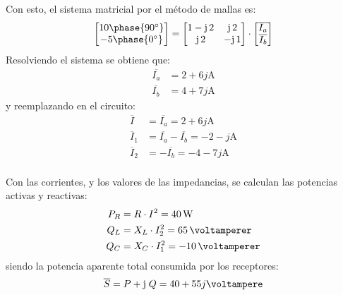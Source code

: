 \begin{example}
          Con esto, el sistema matricial por el método de mallas es:
          \begin{equation*}
            \begin{bmatrix}
              10\phase{90^\circ} \\
              -5\phase{0^\circ} 
            \end{bmatrix}
            =
            \begin{bmatrix}
              1-\mathrm{j}\,2 & \mathrm{j}\,2 \\
              \mathrm{j}\,2 & -\mathrm{j}\,1 \\
            \end{bmatrix}
            \cdot 
            \begin{bmatrix}
              \overline{I_a}\\
              \overline{I_b}
            \end{bmatrix}
          \end{equation*}
          Resolviendo el sistema se obtiene que:
          \begin{align*}
            \overline{I_a}&= 2 + 6j\unit{\ampere}\\
            \overline{I_b}&= 4 + 7j\unit{\ampere}
          \end{align*}
          y reemplazando en el circuito:
          \begin{align*}
            \overline{I}&=\overline{I_a}= 2 + 6j\unit{\ampere}\\
            \overline{I}_1&=\overline{I_a} - \overline{I_b}= -2 -j\unit{\ampere}\\
            \overline{I}_2&=-\overline{I_b}= -4 - 7j\unit{\ampere}\\
          \end{align*}
		
		
          Con las corrientes, y los valores de las impedancias, se
          calculan las potencias activas y reactivas:
          \begin{align*}
            P_R&=R\cdot I^2=\qty{40}{\watt}\\
            Q_L &= X_L\cdot I_2^2=\qty{65}{\voltamperer}\\
            Q_C&=X_C\cdot I_1^2=-\qty{10}{\voltamperer}
          \end{align*}
          siendo la potencia aparente total consumida por los
          receptores:
          \begin{equation*}
            \overline{S}=P+\mathrm{j}\;Q= 40 + 55j\unit{\voltampere}
          \end{equation*}
		

\end{example}
